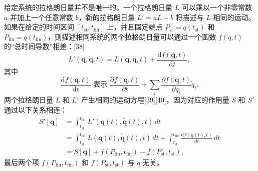 给定系统的拉格朗日量并不是唯一的。一个拉格朗日量 \( L \) 可以乘以一个非零常数 \( a \) 并加上一个任意常数 \( b \)，新的拉格朗日量 \( L' = aL + b \) 将描述与 \( L \) 相同的运动。如果在给定的时间区间 \([t_{\text{st}}, t_{\text{fin}}]\) 上，并且固定端点 \( P_{\text{st}} = q(t_{\text{st}}) \) 和 \( P_{\text{fin}} = q(t_{\text{fin}}) \)，则描述相同系统的两个拉格朗日量可以通过一个函数 \( f(q, t) \) 的“总时间导数”相差：[38]
\[
L'(\mathbf{q}, \dot{\mathbf{q}}, t) = L(\mathbf{q}, \dot{\mathbf{q}}, t) + \frac{\mathrm{d} f(\mathbf{q}, t)}{\mathrm{d} t},~
\]
其中 
\[
\frac{\mathrm{d} f(\mathbf{q}, t)}{\mathrm{d} t} \text{ 表示 } \frac{\partial f(\mathbf{q}, t)}{\partial t} + \sum_{i} \frac{\partial f(\mathbf{q}, t)}{\partial q_{i}} \dot{q}_{i}.~
\]
两个拉格朗日量 \( L \) 和 \( L' \) 产生相同的运动方程[39][40]，因为对应的作用量 \( S \) 和 \( S' \) 通过以下关系相连：
\[
\begin{aligned}
S'[\mathbf{q}] &= \int_{t_{\text{st}}}^{t_{\text{fin}}} L'(\mathbf{q}(t), \dot{\mathbf{q}}(t), t) \, dt \\
&= \int_{t_{\text{st}}}^{t_{\text{fin}}} L(\mathbf{q}(t), \dot{\mathbf{q}}(t), t) \, dt + \int_{t_{\text{st}}}^{t_{\text{fin}}} \frac{\mathrm{d} f(\mathbf{q}(t), t)}{\mathrm{d} t} \, dt \\
&= S[\mathbf{q}] + f(P_{\text{fin}}, t_{\text{fin}}) - f(P_{\text{st}}, t_{\text{st}}),
\end{aligned}~
\]
最后两个项 \( f(P_{\text{fin}}, t_{\text{fin}}) \) 和 \( f(P_{\text{st}}, t_{\text{st}}) \) 与 \( q \) 无关。